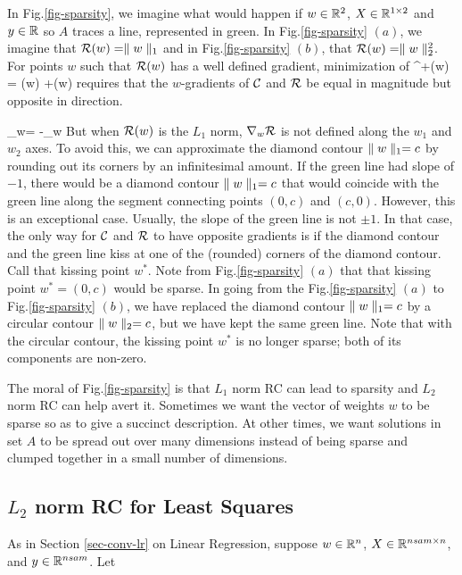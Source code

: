 In Fig.\ref{fig-sparsity}, we imagine
what would happen if
$w\in { \mathbb{R}}^2$, $X\in { \mathbb{R}}^{1\times 2}$
and $y\in { \mathbb{R}}$ so $A$ traces a line,
represented in green.
In Fig.\ref{fig-sparsity} $(a)$,
we imagine that ${\cal R}(w)=\parallel w\parallel_1$
and in Fig.\ref{fig-sparsity} $(b)$, that
${\cal R}(w)=\parallel w\parallel_2^2$.
For points $w$ such that ${\cal R}(w)$
has a well defined gradient, 
minimization of 
\beq
\calc^+(w) = \calc(w) +\calr(w)
\eeq
requires that the $w$-gradients of
${\cal C}$ and ${\cal R}$ be equal in magnitude but opposite in direction.

\beq
\nabla_w\calc = -\nabla_w \calr
\eeq
But when ${\cal R}(w)$ is
the $L_1$ norm,  $\nabla_w{\cal R}$ is not defined along the $w_1$
and $w_2$ axes. To avoid this, we can 
approximate the diamond contour $\parallel w\parallel_1=c$
by rounding out its corners
by an infinitesimal amount. If the green line had 
slope of $-1$,
there would be a diamond contour
 $\parallel w\parallel_1=c$ that would coincide with the green line along the 
 segment connecting points $(0,c)$
 and $(c,0)$. However, this is an exceptional case. Usually, the slope
 of the green line is not $\pm 1$.
 In that case, the only way for 
 ${\cal C}$ and ${\cal R}$ to have
 opposite gradients is if the diamond 
 contour and the green line 
 kiss at one of the (rounded)  corners
 of the diamond contour. Call that
 kissing point $w^*$. Note from
 Fig.\ref{fig-sparsity} $(a)$ that that kissing point $w^*=(0,c)$ would be
 sparse. In going from the Fig.\ref{fig-sparsity} $(a)$ to Fig.\ref{fig-sparsity} $(b)$,
 we have replaced the diamond contour
 $\parallel w\parallel_1=c$ by
 a circular contour $\parallel w\parallel_2=c$,
 but we have kept the same green line.
 Note that with the circular contour,
 the kissing point $w^*$ is no longer sparse; both of its components are non-zero.
 
 The moral of Fig.\ref{fig-sparsity}
 is that $L_1$ norm RC can lead to sparsity and $L_2$ norm RC can help avert it.
 Sometimes we want the vector of weights $w$ to be sparse so as to give
 a succinct description.
 At other times, we want solutions in set $A$ to be spread out over many dimensions instead of being sparse and clumped together in a small number of dimensions.






\subsection{$L_2$ norm RC for Least Squares}
As in Section \ref{sec-conv-lr} on Linear Regression, 
suppose $w\in{ \mathbb{R}}^n$, $X\in { \mathbb{R}}^{nsam\times n}$,
 and  $y\in{ \mathbb{R}}^{nsam} $. Let

